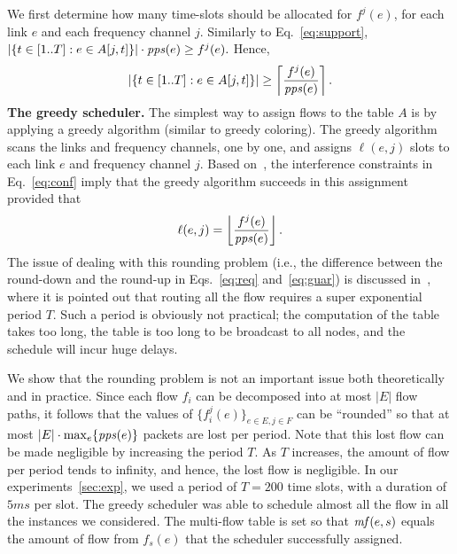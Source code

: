 \documentclass[11pt]{article}
\newenvironment{proof sketch}[1]{\noindent {\emph{Proof sketch of #1:}}}{\hfill \qed}
\newcommand{\pps}{\text{\emph{pps}}}
\newcommand{\mf}{\text{\emph{mf}}}
\begin{document}
We first determine how many time-slots should be allocated for
$f^j(e)$, for each link $e$ and each frequency channel $j$.  Similarly
to Eq.~\ref{eq:support}, 
$
  |\{ t\in[1..T] :e\in A[j,t]\}| \cdot \pps(e) \geq f^j(e).
$
Hence,
\begin{align}\label{eq:req}
  |\{ t\in[1..T] :e\in A[j,t]\}| \geq \left\lceil
    \frac{f^j(e)}{\pps(e)} \right\rceil.
\end{align}
\medskip
\noindent
\textbf{The greedy scheduler.}  The simplest way to assign flows to
the table $A$ is by applying a greedy algorithm (similar to greedy
coloring).  The greedy algorithm scans the links and frequency
channels, one by one, and assigns $\ell(e,j)$ slots to each link $e$
and frequency channel $j$.  Based
on~\cite{alicherry2005joint11,kumar2004end,buragohain2007improved},
the interference constraints in Eq.~\ref{eq:conf} imply that the
greedy algorithm succeeds in this assignment provided that
\begin{align}\label{eq:guar}
  \ell(e,j) = \left\lfloor \frac{f^j(e)}{\pps(e)} \right\rfloor.
\end{align}
The issue of dealing with this rounding problem (i.e., the difference
between the round-down and the round-up in Eqs.~\ref{eq:req}
and~\ref{eq:guar}) is discussed in~\cite{wan2009multiflows}, where it
is pointed out that routing all the flow requires a super exponential
period $T$. Such a period is obviously not practical; the computation
of the table takes too long, the table is too long to be broadcast to
all nodes, and the schedule will incur huge delays.

We show that the rounding problem is not an important issue both
theoretically and in practice.  Since each flow $f_i$ can be
decomposed into at most $|E|$ flow paths, it follows that the values
of $\{f^j_i(e)\}_{e\in E, j\in F}$ can be ``rounded'' so that at most
$|E|\cdot \max_e \{\pps(e)\}$ packets are lost per period.  Note that
this lost flow can be made negligible by increasing the period $T$.
As $T$ increases, the amount of flow per period tends to infinity, and
hence, the lost flow is negligible. In our experiments~\ref{sec:exp},
we used a period of $T=200$ time slots, with a duration of $5ms$ per
slot. The greedy scheduler was able to schedule almost all the flow in
all the instances we considered.  The multi-flow table is set so that
$\mf(e,s)$ equals the amount of flow from $f_s(e)$ that the scheduler
successfully assigned.
\end{document}
